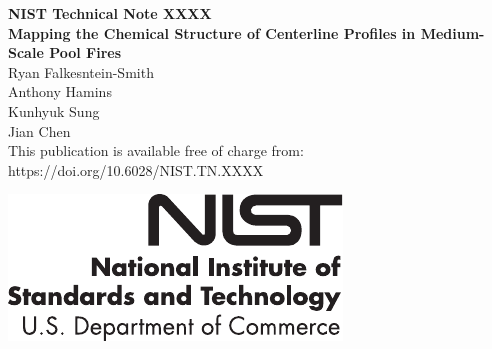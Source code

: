 \documentclass[12pt]{article}
\newcommand{\pubnumber}{XXXX}
\newcommand{\DOI}{https://doi.org/10.6028/NIST.TN.XXXX}
\begin{document}
	
	\begin{titlepage}
		\begin{flushright}
\LARGE{\textbf{NIST Technical Note \pubnumber}}\\
\vfill
\Huge{\textbf{Mapping the Chemical Structure of Centerline Profiles in Medium-Scale Pool Fires}}\\
\vfill
\large Ryan Falkesntein-Smith\\
\large Anthony Hamins\\
\large Kunhyuk Sung\\
\large Jian Chen\\
\vfill
\normalsize This publication is available free of charge from:\\
\DOI\\
\vfill

\includegraphics[width=0.3\linewidth]{NIST-logo}\\ 


\end{flushright}
\end{titlepage}
\end{document}
